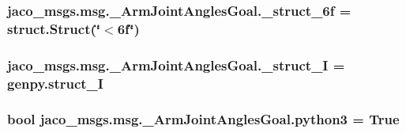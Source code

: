 \subsubsection[{\texorpdfstring{\+\_\+struct\+\_\+6f}{_struct_6f}}]{\setlength{\rightskip}{0pt plus 5cm}jaco\+\_\+msgs.\+msg.\+\_\+\+Arm\+Joint\+Angles\+Goal.\+\_\+struct\+\_\+6f = struct.\+Struct(\char`\"{}$<$6f\char`\"{})\hspace{0.3cm}{\ttfamily [private]}}\hypertarget{namespacejaco__msgs_1_1msg_1_1__ArmJointAnglesGoal_a9f11880df4c70c65dbd55e7e0363d75c}{}\label{namespacejaco__msgs_1_1msg_1_1__ArmJointAnglesGoal_a9f11880df4c70c65dbd55e7e0363d75c}
\subsubsection[{\texorpdfstring{\+\_\+struct\+\_\+I}{_struct_I}}]{\setlength{\rightskip}{0pt plus 5cm}jaco\+\_\+msgs.\+msg.\+\_\+\+Arm\+Joint\+Angles\+Goal.\+\_\+struct\+\_\+I = genpy.\+struct\+\_\+I\hspace{0.3cm}{\ttfamily [private]}}\hypertarget{namespacejaco__msgs_1_1msg_1_1__ArmJointAnglesGoal_aa16363ec022a54b0264c3df8dce7c89b}{}\label{namespacejaco__msgs_1_1msg_1_1__ArmJointAnglesGoal_aa16363ec022a54b0264c3df8dce7c89b}
\subsubsection[{\texorpdfstring{python3}{python3}}]{\setlength{\rightskip}{0pt plus 5cm}bool jaco\+\_\+msgs.\+msg.\+\_\+\+Arm\+Joint\+Angles\+Goal.\+python3 = True}\hypertarget{namespacejaco__msgs_1_1msg_1_1__ArmJointAnglesGoal_a3c1fa2cf2fcfecc3f172c11e92151baa}{}\label{namespacejaco__msgs_1_1msg_1_1__ArmJointAnglesGoal_a3c1fa2cf2fcfecc3f172c11e92151baa}
